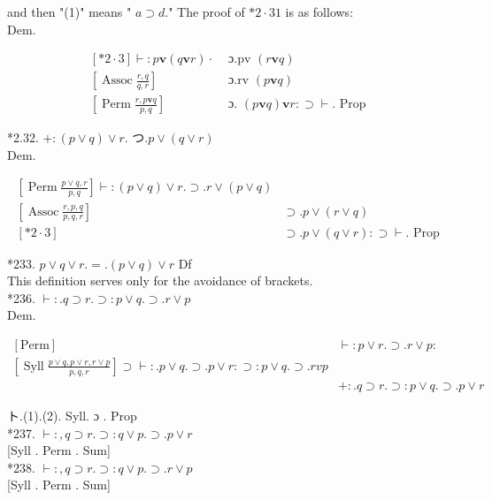 \documentclass[10pt]{article}
\begin{document}
and then "(1)" means " $a \supset d$." The proof of $* 2 \cdot 31$ is as follows:\\
Dem.

$$
\begin{array}{ll}
{[* 2 \cdot 3] \vdash: p \mathbf{v}(q \mathbf{v} r) \cdot} & \text { ɔ.pv }(r \mathbf{v} q) \\
{\left[\operatorname{Assoc} \frac{r, q}{q, r}\right]} & \text { ɔ.rv }(p \mathbf{v} q) \\
{\left[\operatorname{Perm} \frac{r, p \mathbf{v} q}{p, q}\right]} & \text { ɔ. }(p \mathbf{v} q) \mathbf{v} r: \supset \vdash . \text { Prop }
\end{array}
$$

*2.32. $+:(p \vee q) \vee r$. つ.$p \vee(q \vee r)$\\
Dem.

$$
\begin{array}{ll}
{\left[\operatorname{Perm} \frac{p \vee q, r}{p, q}\right] \vdash:(p \vee q) \vee r . \supset . r \vee(p \vee q)} \\
{\left[\operatorname{Assoc} \frac{r, p, q}{p, q, r}\right]} & \supset . p \vee(r \vee q) \\
{[* 2 \cdot 3]} & \supset . p \vee(q \vee r): \supset \vdash . \text { Prop }
\end{array}
$$

*233. $p \vee q \vee r .=.(p \vee q) \vee r$ Df\\
This definition serves only for the avoidance of brackets.\\
*236. $\vdash: . q \supset r . \supset: p \vee q . \supset . r \vee p$\\
Dem.

\[
\begin{array}{ll}
{[\mathrm{Perm}]} & \vdash: p \vee r . \supset . r \vee p: \\
{\left[\operatorname{Syll} \frac{p \vee q, p \vee r, r \vee p}{p, q, r}\right] \supset \vdash: . p \vee q . \supset . p \vee r: \supset: p \vee q . \supset . r v p} \\
& +: . q \supset r . \supset: p \vee q . \supset . p \vee r \tag{2}
\end{array}
\]

ト.(1).(2). Syll. ɔ . Prop\\
*237. $\vdash:, q \supset r . \supset: q \vee p . \supset . p \vee r$\\[0pt]
[Syll . Perm . Sum]\\
*238. $\vdash:, q \supset r . \supset: q \vee p . \supset . r \vee p$\\[0pt]
[Syll . Perm . Sum]
\end{document}
